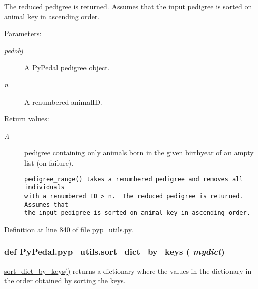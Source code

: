 The reduced pedigree is returned. Assumes that the input pedigree is sorted on animal key in ascending order. \begin{Desc}
\item[Parameters:]
\begin{description}
\item[{\em pedobj}]A Py\-Pedal pedigree object. \item[{\em n}]A renumbered animal\-ID. \end{description}
\end{Desc}
\begin{Desc}
\item[Return values:]
\begin{description}
\item[{\em A}]pedigree containing only animals born in the given birthyear of an ampty list (on failure).

\footnotesize\begin{verbatim}pedigree_range() takes a renumbered pedigree and removes all individuals
with a renumbered ID > n.  The reduced pedigree is returned.  Assumes that
the input pedigree is sorted on animal key in ascending order.
\end{verbatim}
\normalsize
 \end{description}
\end{Desc}


Definition at line 840 of file pyp\_\-utils.py.\hypertarget{namespacePyPedal_1_1pyp__utils_63d2062b3cf5023742e3cd85e87f7234}{
\subsubsection[sort\_\-dict\_\-by\_\-keys]{\setlength{\rightskip}{0pt plus 5cm}def Py\-Pedal.pyp\_\-utils.sort\_\-dict\_\-by\_\-keys ( {\em mydict})}}
\label{namespacePyPedal_1_1pyp__utils_63d2062b3cf5023742e3cd85e87f7234}


\hyperlink{namespacePyPedal_1_1pyp__utils_63d2062b3cf5023742e3cd85e87f7234}{sort\_\-dict\_\-by\_\-keys()} returns a dictionary where the values in the dictionary in the order obtained by sorting the keys. 

